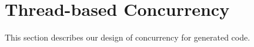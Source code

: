 \section{Thread-based Concurrency}
\label{sec:thread}
This section describes our design of concurrency for generated code. 

%
